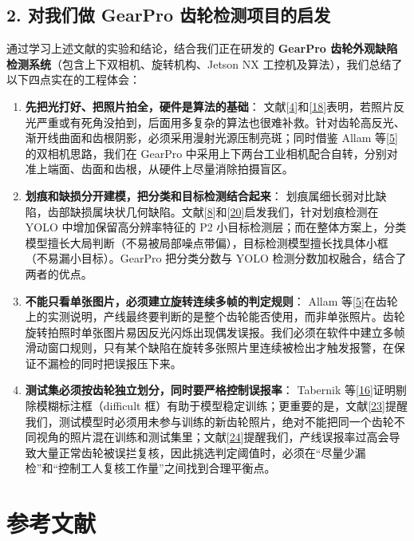 \subsection*{2. 对我们做 GearPro 齿轮检测项目的启发}
通过学习上述文献的实验和结论，结合我们正在研发的 \textbf{GearPro 齿轮外观缺陷检测系统}（包含上下双相机、旋转机构、Jetson NX 工控机及算法），我们总结了以下四点实在的工程体会：

\begin{enumerate}
\item \textbf{先把光打好、把照片拍全，硬件是算法的基础}：
文献[\hyperlink{ref:4}{4}]和[\hyperlink{ref:18}{18}]表明，若照片反光严重或有死角没拍到，后面用多复杂的算法也很难补救。针对齿轮高反光、渐开线曲面和齿根阴影，必须采用漫射光源压制亮斑；同时借鉴 Allam 等[\hyperlink{ref:5}{5}]的双相机思路，我们在 GearPro 中采用上下两台工业相机配合自转，分别对准上端面、齿面和齿根，从硬件上尽量消除拍摄盲区。
\item \textbf{划痕和缺损分开建模，把分类和目标检测结合起来}：
划痕属细长弱对比缺陷，齿部缺损属块状几何缺陷。文献[\hyperlink{ref:8}{8}]和[\hyperlink{ref:20}{20}]启发我们，针对划痕检测在 YOLO 中增加保留高分辨率特征的 P2 小目标检测层；而在整体方案上，分类模型擅长大局判断（不易被局部噪点带偏），目标检测模型擅长找具体小框（不易漏小目标）。GearPro 把分类分数与 YOLO 检测分数加权融合，结合了两者的优点。
\item \textbf{不能只看单张图片，必须建立旋转连续多帧的判定规则}：
Allam 等[\hyperlink{ref:5}{5}]在齿轮上的实测说明，产线最终要判断的是整个齿轮能否使用，而非单张照片。齿轮旋转拍照时单张图片易因反光闪烁出现偶发误报。我们必须在软件中建立多帧滑动窗口规则，只有某个缺陷在旋转多张照片里连续被检出才触发报警，在保证不漏检的同时把误报压下来。
\item \textbf{测试集必须按齿轮独立划分，同时要严格控制误报率}：
Tabernik 等[\hyperlink{ref:16}{16}]证明剔除模糊标注框（difficult 框）有助于模型稳定训练；更重要的是，文献[\hyperlink{ref:23}{23}]提醒我们，测试模型时必须用未参与训练的新齿轮照片，绝对不能把同一个齿轮不同视角的照片混在训练和测试集里；文献[\hyperlink{ref:24}{24}]提醒我们，产线误报率过高会导致大量正常齿轮被误拦复核，因此挑选判定阈值时，必须在“尽量少漏检”和“控制工人复核工作量”之间找到合理平衡点。

\end{enumerate}

\begingroup
{}
\section*{参考文献}

